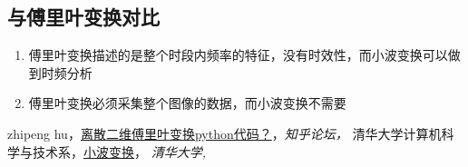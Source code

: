 \documentclass{article}
\begin{document}
        \subsection{与傅里叶变换对比}
        \begin{enumerate}
          \item 傅里叶变换描述的是整个时段内频率的特征，没有时效性，而小波变换可以做到时频分析
          \item 傅里叶变换必须采集整个图像的数据，而小波变换不需要
        \end{enumerate}
    \clearpage
       \begin{thebibliography}{90}
       {       
       \bibitem{} zhipeng hu，\href{https://www.zhihu.com/question/27358117}{离散二维傅里叶变换python代码？}，{\it 知乎论坛，}
       \bibitem{} 清华大学计算机科学与技术系，\href{http://media.cs.tsinghua.edu.cn/~ahz/digitalimageprocess/chapter12/chapt12_ahz.htm}{小波变换}， {\it 清华大学, } }
       \end{thebibliography} 
\end{document}
